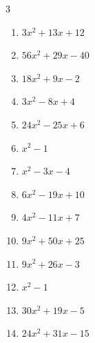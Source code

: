 \begin{multicols}{3}
\begin{enumerate}
        \phantom{$=(5x+2)(6x+7)$}

  \item $3x^{2}+13x+12$

        \phantom{$=(x+3)(3x+4)$}

  \item $56x^{2}+29x-40$

        \phantom{$=(8x-5)(7x+8)$}

  \item $18x^{2}+9x-2$

        \phantom{$=(3x+2)(6x-1)$}

  \item $3x^{2}-8x+4$

        \phantom{$=(x-2)(3x-2)$}

  \item $24x^{2}-25x+6$

        \phantom{$=(8x-3)(3x-2)$}

  \item $x^{2}-1$

        \phantom{$=(x+1)(x-1)$}

\columnbreak %

  \item $x^{2}-3x-4$

        \phantom{$=(x-4)(x+1)$}

  \item $6x^{2}-19x+10$

        \phantom{$=(2x-5)(3x-2)$}

  \item $4x^{2}-11x+7$

        \phantom{$=(x-1)(4x-7)$}

  \item $9x^{2}+50x+25$

        \phantom{$=(x+5)(9x+5)$}

  \item $9x^{2}+26x-3$

        \phantom{$=(x+3)(9x-1)$}

  \item $x^{2}-1$

        \phantom{$=(x+1)(x-1)$}

  \item $30x^{2}+19x-5$

        \phantom{$=(5x-1)(6x+5)$}

  \item $24x^{2}+31x-15$

        \phantom{$=(3x+5)(8x-3)$}


\end{enumerate}
\end{multicols}
